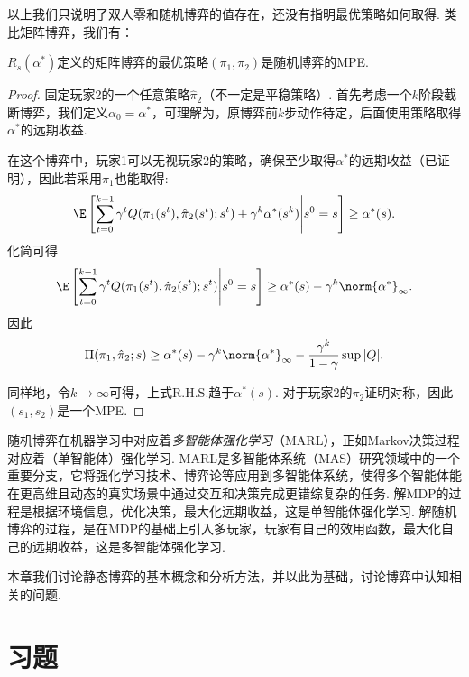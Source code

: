 以上我们只说明了双人零和随机博弈的值存在，还没有指明最优策略如何取得. 类比矩阵博弈，我们有：
\begin{theorem}
$R_s(\alpha^*)$定义的矩阵博弈的最优策略$(\pi_1,\pi_2)$是随机博弈的MPE. 
\end{theorem}
\begin{proof}
固定玩家2的一个任意策略$\hat{\pi}_2$（不一定是平稳策略）. 首先考虑一个$k$阶段截断博弈，我们定义$\alpha_0=\alpha^*$，可理解为，原博弈前$k$步动作待定，后面使用策略取得$\alpha^*$的远期收益.

在这个博弈中，玩家1可以无视玩家2的策略，确保至少取得$\alpha^*$的远期收益（已证明），因此若采用$\pi_1$也能取得:
\[\E\left[\sum_{t=0}^{k-1}\gamma^tQ(\pi_1(s^t),\hat{\pi}_2(s^t);s^t)+\gamma^k\alpha^*(s^k)\middle|s^0=s\right]\geq \alpha^*(s).\]
化简可得
\[\E\left[\sum_{t=0}^{k-1}\gamma^tQ(\pi_1(s^t),\hat{\pi}_2(s^t);s^t)\middle|s^0=s\right]\geq \alpha^*(s)-\gamma^k\norm{\alpha^*}_\infty.\]
因此
\[\Pi(\pi_1,\hat{\pi}_2;s)\geq \alpha^*(s) - \gamma^k\norm{\alpha^*}_\infty - \frac{\gamma^k}{1-\gamma}\sup|Q|.\]

同样地，令$k\to\infty$可得，上式R.H.S.趋于$\alpha^*(s)$. 对于玩家2的$\pi_2$证明对称，因此$(s_1,s_2)$是一个MPE.
\end{proof}

随机博弈在机器学习中对应着\emph{多智能体强化学习}（MARL），正如Markov决策过程对应着（单智能体）强化学习. MARL是多智能体系统（MAS）研究领域中的一个重要分支，它将强化学习技术、博弈论等应用到多智能体系统，使得多个智能体能在更高维且动态的真实场景中通过交互和决策完成更错综复杂的任务. 解MDP的过程是根据环境信息，优化决策，最大化远期收益，这是单智能体强化学习. 解随机博弈的过程，是在MDP的基础上引入多玩家，玩家有自己的效用函数，最大化自己的远期收益，这是多智能体强化学习. 


本章我们讨论静态博弈的基本概念和分析方法，并以此为基础，讨论博弈中认知相关的问题. 

\section{习题}



